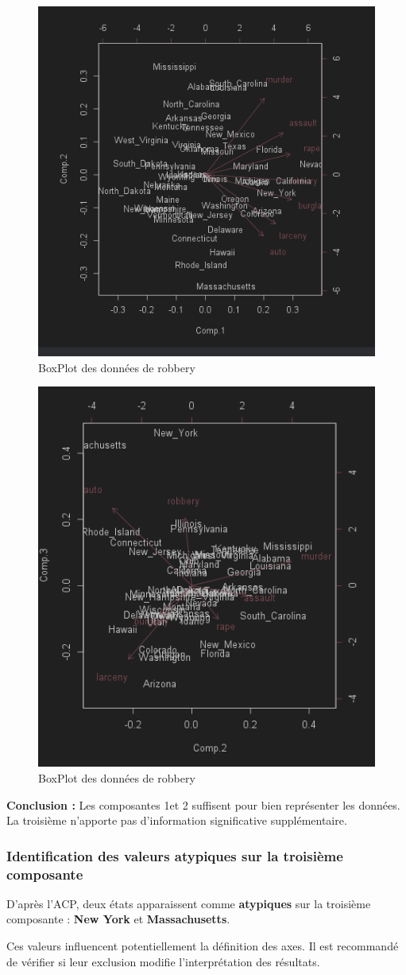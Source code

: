 \documentclass{article}
\begin{document}
    \begin{figure}[H]
        \centering
        \includegraphics[width=0.5\linewidth]{img/bigplotcrimeacp}
        \caption{BoxPlot des données de robbery}
    \end{figure}

    \begin{figure}[H]
        \centering
        \includegraphics[width=0.5\linewidth]{img/bigplotcrimeacp2}
        \caption{BoxPlot des données de robbery}
    \end{figure}
    \textbf{Conclusion :} Les composantes 1et 2 suffisent pour bien représenter les données. La troisième n'apporte pas d’information significative supplémentaire.
    \subsubsection{Identification des valeurs atypiques sur la troisième composante}

    D’après l’ACP, deux états apparaissent comme \textbf{atypiques} sur la troisième composante : \textbf{New York} et \textbf{Massachusetts}.

    Ces valeurs influencent potentiellement la définition des axes. Il est recommandé de vérifier si leur exclusion modifie l’interprétation des résultats.
\end{document}
